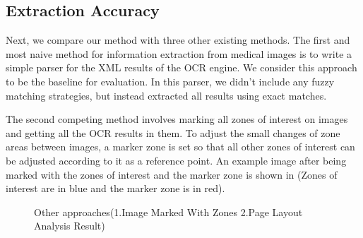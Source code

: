 
\subsection{Extraction Accuracy}
Next, we compare our method with three other existing methods.
The first and most naive method for information extraction from medical images 
is to write a simple parser for the XML results of the OCR engine. 
We consider this approach to be the baseline for 
evaluation. In this parser, we didn't include any fuzzy matching 
strategies, but instead extracted all results using exact matches. 

The second competing method involves marking all zones of interest on images and 
getting all the OCR results in them. To adjust the small changes of 
zone areas between images, a marker zone is set so that 
all other zones of interest can be adjusted according to it as
a reference point. 
An example image after being marked with the zones of interest 
and the marker zone is shown in  (Zones of interest 
are in blue and the marker zone is in red).

\begin{figure*}[ht]
\centering
{}
{}
\caption{Other approaches(1.Image Marked With Zones 2.Page Layout Analysis Result)}
\label{fig:othermethods}
\end{figure*}


